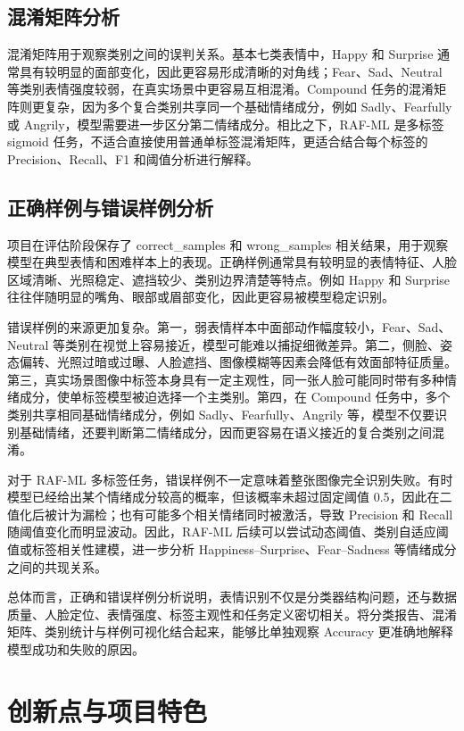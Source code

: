 \documentclass[UTF8,a4paper,12pt]{ctexart}
\begin{document}
\subsection{混淆矩阵分析}

混淆矩阵用于观察类别之间的误判关系。基本七类表情中，Happy 和 Surprise 通常具有较明显的面部变化，因此更容易形成清晰的对角线；Fear、Sad、Neutral 等类别表情强度较弱，在真实场景中更容易互相混淆。Compound 任务的混淆矩阵则更复杂，因为多个复合类别共享同一个基础情绪成分，例如 Sadly、Fearfully 或 Angrily，模型需要进一步区分第二情绪成分。相比之下，RAF-ML 是多标签 sigmoid 任务，不适合直接使用普通单标签混淆矩阵，更适合结合每个标签的 Precision、Recall、F1 和阈值分析进行解释。

\subsection{正确样例与错误样例分析}

项目在评估阶段保存了 correct\_samples 和 wrong\_samples 相关结果，用于观察模型在典型表情和困难样本上的表现。正确样例通常具有较明显的表情特征、人脸区域清晰、光照稳定、遮挡较少、类别边界清楚等特点。例如 Happy 和 Surprise 往往伴随明显的嘴角、眼部或眉部变化，因此更容易被模型稳定识别。

错误样例的来源更加复杂。第一，弱表情样本中面部动作幅度较小，Fear、Sad、Neutral 等类别在视觉上容易接近，模型可能难以捕捉细微差异。第二，侧脸、姿态偏转、光照过暗或过曝、人脸遮挡、图像模糊等因素会降低有效面部特征质量。第三，真实场景图像中标签本身具有一定主观性，同一张人脸可能同时带有多种情绪成分，使单标签模型被迫选择一个主类别。第四，在 Compound 任务中，多个类别共享相同基础情绪成分，例如 Sadly、Fearfully、Angrily 等，模型不仅要识别基础情绪，还要判断第二情绪成分，因而更容易在语义接近的复合类别之间混淆。

对于 RAF-ML 多标签任务，错误样例不一定意味着整张图像完全识别失败。有时模型已经给出某个情绪成分较高的概率，但该概率未超过固定阈值 0.5，因此在二值化后被计为漏检；也有可能多个相关情绪同时被激活，导致 Precision 和 Recall 随阈值变化而明显波动。因此，RAF-ML 后续可以尝试动态阈值、类别自适应阈值或标签相关性建模，进一步分析 Happiness--Surprise、Fear--Sadness 等情绪成分之间的共现关系。

总体而言，正确和错误样例分析说明，表情识别不仅是分类器结构问题，还与数据质量、人脸定位、表情强度、标签主观性和任务定义密切相关。将分类报告、混淆矩阵、类别统计与样例可视化结合起来，能够比单独观察 Accuracy 更准确地解释模型成功和失败的原因。

\section{创新点与项目特色}
\end{document}
